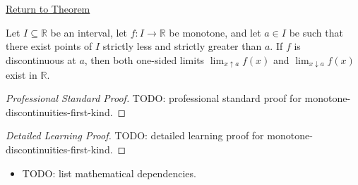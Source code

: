 \newpage
{}
\label{prf:monotone-discontinuities-first-kind}

\begin{remark*}[Return]
\hyperref[prop:monotone-discontinuities-first-kind]{Return to Theorem}
\end{remark*}

\begin{theorem*}
Let $I \subseteq \mathbb{R}$ be an interval, let $f:I \to \mathbb{R}$ be monotone, and let $a \in I$ be such that there exist points of $I$ strictly less and strictly greater than $a$. If $f$ is discontinuous at $a$, then both one-sided limits $\lim_{x\uparrow a} f(x)$ and $\lim_{x\downarrow a} f(x)$ exist in $\mathbb{R}$.
\end{theorem*}

\begin{proof}[Professional Standard Proof]
\LRAProofBodyStart
TODO: professional standard proof for monotone-discontinuities-first-kind.
\end{proof}

\begin{proof}[Detailed Learning Proof]
\LRAProofBodyStart
TODO: detailed learning proof for monotone-discontinuities-first-kind.
\end{proof}

\begin{remark*}
\end{remark*}

\begin{dependencies}
\begin{itemize}
  \item TODO: list mathematical dependencies.
\end{itemize}
\end{dependencies}

\clearpage
